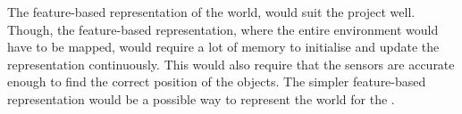 The feature-based representation of the world, would suit the project well. Though, the feature-based representation, where the entire environment would have to be mapped, would require a lot of memory to initialise and update the representation continuously. This would also require that the sensors are accurate enough to find the correct position of the objects. The simpler feature-based representation would be a possible way to represent the world for the \projname{}. 



